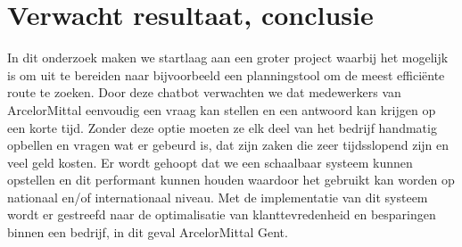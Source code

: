 \section{Verwacht resultaat, conclusie}%
\label{sec:verwachte_resultaten}
In dit onderzoek maken we startlaag aan een groter project waarbij het mogelijk is om uit te bereiden naar bijvoorbeeld een planningstool om de meest efficiënte route te zoeken.
Door deze chatbot verwachten we dat medewerkers van ArcelorMittal eenvoudig een vraag kan stellen en een antwoord kan krijgen op een korte tijd.
Zonder deze optie moeten ze elk deel van het bedrijf handmatig opbellen en vragen wat er gebeurd is, dat zijn zaken die zeer tijdsslopend zijn en veel geld kosten.
Er wordt gehoopt dat we een schaalbaar systeem kunnen opstellen en dit performant kunnen houden waardoor het gebruikt kan worden op nationaal en/of internationaal niveau.
Met de implementatie van dit systeem wordt er gestreefd naar de optimalisatie van klanttevredenheid en besparingen binnen een bedrijf, in dit geval ArcelorMittal Gent.
